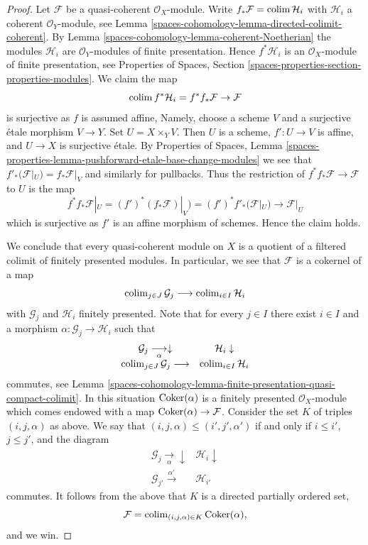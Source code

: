 \begin{proof}
Let $\mathcal{F}$ be a quasi-coherent $\mathcal{O}_X$-module.
Write $f_*\mathcal{F} = \operatorname{colim} \mathcal{H}_i$ with $\mathcal{H}_i$
a coherent $\mathcal{O}_Y$-module, see
Lemma \ref{spaces-cohomology-lemma-directed-colimit-coherent}.
By Lemma \ref{spaces-cohomology-lemma-coherent-Noetherian} the modules $\mathcal{H}_i$
are $\mathcal{O}_Y$-modules of finite presentation. Hence
$f^*\mathcal{H}_i$ is an $\mathcal{O}_X$-module of finite presentation, see
Properties of Spaces, Section
\ref{spaces-properties-section-properties-modules}.
We claim the map
$$
\operatorname{colim} f^*\mathcal{H}_i = f^*f_*\mathcal{F} \to \mathcal{F}
$$
is surjective as $f$ is assumed affine, Namely, choose
a scheme $V$ and a surjective \'etale morphism $V \to Y$. Set
$U = X \times_Y V$. Then $U$ is a scheme, $f' : U \to V$ is affine, and
$U \to X$ is surjective \'etale. By
Properties of Spaces, Lemma
\ref{spaces-properties-lemma-pushforward-etale-base-change-modules}
we see that $f'_*(\mathcal{F}|_U) = f_*\mathcal{F}|_V$ and similarly
for pullbacks. Thus the restriction of $f^*f_*\mathcal{F} \to \mathcal{F}$
to $U$ is the map
$$
f^*f_*\mathcal{F}|_U = (f')^*(f_*\mathcal{F})|_V) =
(f')^*f'_*(\mathcal{F}|_U) \to \mathcal{F}|_U
$$
which is surjective as $f'$ is an affine morphism of schemes.
Hence the claim holds.

\medskip\noindent
We conclude that every quasi-coherent module on $X$ is a quotient of a
filtered colimit of finitely presented modules. In particular, we see that
$\mathcal{F}$ is a cokernel of a map
$$
\operatorname{colim}_{j \in J} \mathcal{G}_j \longrightarrow \operatorname{colim}_{i \in I} \mathcal{H}_i
$$
with $\mathcal{G}_j$ and $\mathcal{H}_i$ finitely presented. Note
that for every $j \in I$ there exist $i \in I$ and a morphism
$\alpha : \mathcal{G}_j \to \mathcal{H}_i$ such that
$$
\begin{array}{cc}\mathcal{G}_j \underset{\alpha}{\longrightarrow}\downarrow & \mathcal{H}_i \downarrow \\ \operatorname{colim}_{j \in J} \mathcal{G}_j \longrightarrow & \operatorname{colim}_{i \in I} \mathcal{H}_i\end{array}
$$
commutes, see
Lemma \ref{spaces-cohomology-lemma-finite-presentation-quasi-compact-colimit}.
In this situation $\operatorname{Coker}(\alpha)$ is a finitely presented
$\mathcal{O}_X$-module which comes endowed with a map
$\operatorname{Coker}(\alpha) \to \mathcal{F}$. Consider the set $K$ of
triples $(i, j, \alpha)$ as above. We say that
$(i, j, \alpha) \leq (i', j', \alpha')$ if and only if
$i \leq i'$, $j \leq j'$, and the diagram
$$
\begin{array}{cc}\mathcal{G}_j \underset{\alpha}{\longrightarrow}\downarrow & \mathcal{H}_i \downarrow \\ \mathcal{G}_{j'} \overset{\alpha'}{\longrightarrow} & \mathcal{H}_{i'}\end{array}
$$
commutes. It follows from the above that $K$ is
a directed partially ordered set,
$$
\mathcal{F} = \operatorname{colim}_{(i, j, \alpha) \in K} \operatorname{Coker}(\alpha),
$$
and we win.
\end{proof}

